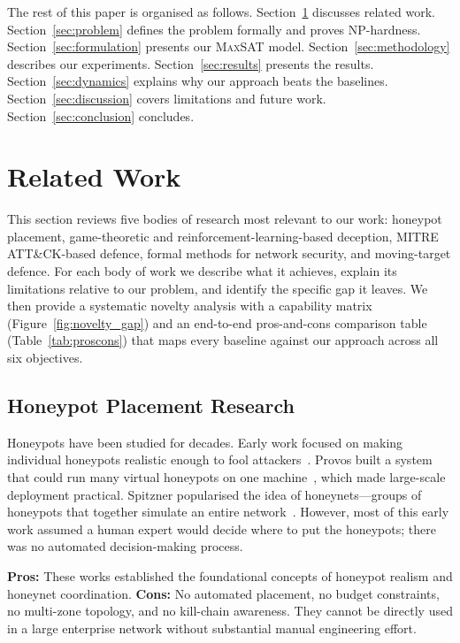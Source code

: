 \documentclass[journal]{IEEEtran}
\newcommand{\maxsat}{\textsc{MaxSAT}}
\begin{document}
The rest of this paper is organised as follows.
Section~\ref{sec:related} discusses related work.
Section~\ref{sec:problem} defines the problem formally and
proves NP-hardness.
Section~\ref{sec:formulation} presents our \maxsat{} model.
Section~\ref{sec:methodology} describes our experiments.
Section~\ref{sec:results} presents the results.
Section~\ref{sec:dynamics} explains why our approach beats
the baselines.
Section~\ref{sec:discussion} covers limitations and future
work.
Section~\ref{sec:conclusion} concludes.

\section{Related Work}
\label{sec:related}

This section reviews five bodies of research most relevant
to our work: honeypot placement, game-theoretic and
reinforcement-learning-based deception, MITRE ATT\&CK-based
defence, formal methods for network security, and
moving-target defence.
For each body of work we describe what it achieves, explain
its limitations relative to our problem, and identify the
specific gap it leaves.
We then provide a systematic novelty analysis with a
capability matrix (Figure~\ref{fig:novelty_gap}) and an
end-to-end pros-and-cons comparison table
(Table~\ref{tab:proscons}) that maps every baseline against
our approach across all six objectives.

\subsection{Honeypot Placement Research}

Honeypots have been studied for decades.
Early work focused on making individual honeypots realistic
enough to fool attackers~\cite{spitzner2003}.
Provos built a system that could run many virtual honeypots
on one machine~\cite{provos2004}, which made large-scale
deployment practical.
Spitzner popularised the idea of honeynets---groups of
honeypots that together simulate an entire
network~\cite{spitzner2003}.
However, most of this early work assumed a human expert
would decide where to put the honeypots; there was no
automated decision-making process.

\textbf{Pros:} These works established the foundational
concepts of honeypot realism and honeynet coordination.
\textbf{Cons:} No automated placement, no budget constraints,
no multi-zone topology, and no kill-chain awareness.
They cannot be directly used in a large enterprise network
without substantial manual engineering effort.
\end{document}
